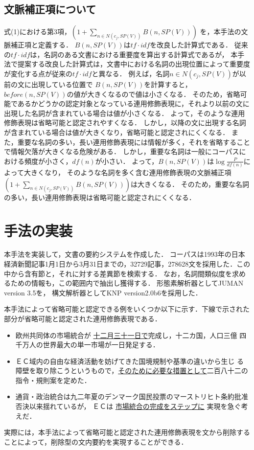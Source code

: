 \subsection{文脈補正項について}
式(1)における第3項，$(1+\sum_{n \in N(c_{j},SP(V))}B(n,SP(V)))$
を，本手法の文脈補正項と定義する．
$B(n,SP(V))$は$tf\cdot{}idf$\cite{tfidf}を改良した計算式である．
従来の$tf\cdot{}idf$は，名詞のある文書における重要度を算出する計算式であるが，
本手法で提案する改良した計算式は，文書中における名詞の出現位置によって重要度が変化する点が従来の$tf\cdot{}idf$と異なる．
例えば，名詞$n \in N(c_{j},SP(V))$が以前の文に出現している位置で
$B(n,SP(V))$を計算すると，$before(n,SP(V))$の値が大きくなるので値は小さくなる．
そのため，省略可能であるかどうかの認定対象となっている連用修飾表現に，それより以前の文に出現した名詞が含まれている場合は値が小さくなる．
よって，そのような連用修飾表現は省略可能と認定されやすくなる．
しかし，以降の文に出現する名詞が含まれている場合は値が大きくなり，省略可能と認定されにくくなる．
また，重要な名詞の多い，長い連用修飾表現には情報が多く，それを省略することで情報欠落が大きくなる危険がある．
しかし，重要な名詞は一般にコーパスにおける頻度が小さく，$df(n)$が小さい．
よって，$B(n,SP(V))$は$\log \frac{P}{df(n)}$によって大きくなり，
そのような名詞を多く含む連用修飾表現の文脈補正項
$(1+\sum_{n \in N(c_{j},SP(V))}B(n,SP(V)))$は大きくなる．
そのため，重要な名詞の多い，長い連用修飾表現は省略可能と認定されにくくなる．
\section{手法の実装}
本手法を実装して，文書の要約システムを作成した．
コーパスは1993年の日本経済新聞記事1月1日から3月31日までの，32729記事，278628文を採用した．この中から含有節と，それに対する差異節を検索する．
なお，名詞間類似度を求めるための情報も，この範囲内で抽出し獲得する．
形態素解析器としてJUMAN version 3.5を，
構文解析器としてKNP version2.0b6を採用した．

本手法によって省略可能と認定できる例をいくつか以下に示す．下線で示された部分が省略可能と認定された連用修飾表現である．

\begin{itemize}
\item {\footnotesize 欧州共同体の市場統合が \underline{十二月三十一日で}完成し，十二カ国，人口三億
四千万人の世界最大の単一市場が一日発足する．}
\item {\footnotesize ＥＣ域内の自由な経済活動を妨げてきた国境規制や基準の違いから生じ
る障壁を取り除こうというもので，\underline{そのために必要な措置として}二百八十二の指令・規則案を定めた．}
\item {\footnotesize 通貨・政治統合は九二年夏のデンマーク国民投票のマーストリヒト条約批准否決以来揺れているが，
ＥＣは \underline{市場統合の完成をステップに} 実現を急ぐ考えだ．}
\end{itemize}
実際には，本手法によって省略可能と認定された連用修飾表現を文から削除することによって，削除型の文内要約を実現することができる．
